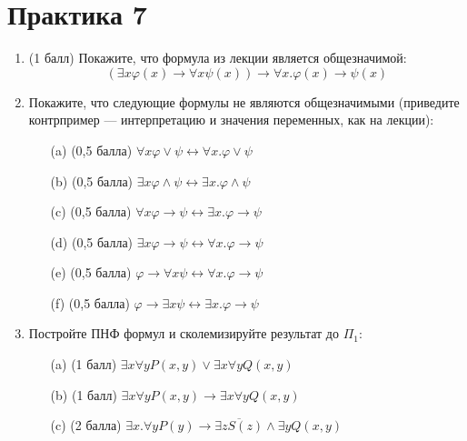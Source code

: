 \section{Практика 7}
\begin{enumerate}
    \item (1 балл) Покажите, что формула из лекции является общезначимой:
    $$(\exists x\varphi(x) \rightarrow \forall x\psi(x)) \rightarrow \forall x. \varphi(x) \rightarrow \psi(x)$$
    \item Покажите, что следующие формулы не являются общезначимыми (приведите контрпример — интерпретацию и значения переменных, как на лекции):
    \begin{itemize}
        \item[(a)] (0,5 балла) $\forall x\varphi \lor \psi \leftrightarrow \forall x. \varphi \lor \psi$
        \item[(b)] (0,5 балла) $\exists x\varphi \land \psi \leftrightarrow \exists x. \varphi \land \psi$
        \item[(c)] (0,5 балла) $\forall x\varphi \rightarrow \psi \leftrightarrow \exists x. \varphi \rightarrow \psi$
        \item[(d)] (0,5 балла) $\exists x\varphi \rightarrow \psi \leftrightarrow \forall x. \varphi \rightarrow \psi$
        \item[(e)] (0,5 балла) $\varphi \rightarrow \forall x\psi \leftrightarrow \forall x. \varphi \rightarrow \psi$
        \item[(f)] (0,5 балла) $\varphi \rightarrow \exists x\psi \leftrightarrow \exists x. \varphi \rightarrow \psi$
    \end{itemize}
    \item Постройте ПНФ формул и сколемизируйте результат до $\Pi_1$:
    \begin{itemize}
        \item[(a)] (1 балл) $\exists x\forall y P(x, y) \lor \exists x\forall y Q(x, y)$
        \item[(b)] (1 балл) $\exists x\forall y P(x, y) \rightarrow \exists x\forall y Q(x, y)$
        \item[(c)] (2 балла) $\exists x. \forall y P(y) \rightarrow \overline{\exists z S(z)} \land \exists y Q(x, y)$
    \end{itemize}
\end{enumerate}
\clearpage
